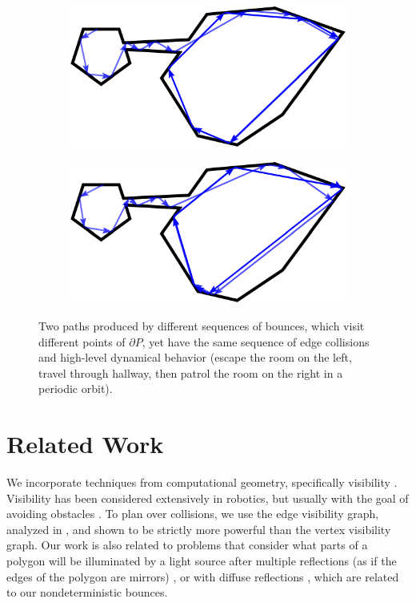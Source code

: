 \documentclass[]{article}
\begin{document}
\begin{figure}
\centering
\begin{subfigure}{0.5\textwidth}
\includegraphics[width=\linewidth]{figures/twoc_a}
\end{subfigure}%
\begin{subfigure}{0.5\textwidth}
\includegraphics[width=\linewidth]{figures/twoc_b}
\end{subfigure}
\caption{Two paths produced by different sequences of bounces, which visit
different points of $\partial P$, yet have the same sequence of edge collisions 
and high-level dynamical behavior (escape the room on the left, travel through hallway, then
patrol the room on the right in a periodic orbit).
}

\label{fig:twopaths}
\end{figure}

\section{Related Work}

We incorporate techniques from computational geometry, specifically visibility
\cite{ghosh2007visibility}. Visibility has been considered extensively in
robotics, but usually with the goal of avoiding obstacles
\cite{lozano1979algorithm,SimLauNis00}. To plan over collisions, we use the edge
visibility graph, analyzed in \cite{rourke_viz}, and shown to be strictly more
powerful than the vertex visibility graph. Our work is also related to problems
that consider what parts of a polygon will be illuminated by a light source
after multiple reflections (as if the edges of the polygon are mirrors)
\cite{Aronov1996}, or with diffuse reflections \cite{prasad1998visibility},
which are related to our nondeterministic bounces.
\end{document}
